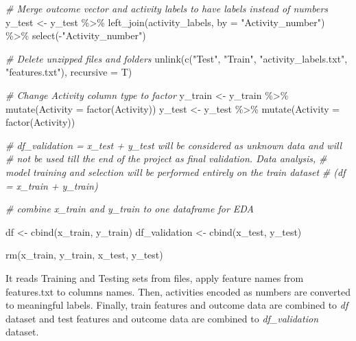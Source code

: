 \documentclass[
]{article}
\newenvironment{Shaded}{\begin{snugshade}}{\end{snugshade}}
\newcommand{\AttributeTok}[1]{\textcolor[rgb]{0.77,0.63,0.00}{#1}}
\newcommand{\CommentTok}[1]{\textcolor[rgb]{0.56,0.35,0.01}{\textit{#1}}}
\newcommand{\FunctionTok}[1]{\textcolor[rgb]{0.00,0.00,0.00}{#1}}
\newcommand{\NormalTok}[1]{#1}
\newcommand{\OtherTok}[1]{\textcolor[rgb]{0.56,0.35,0.01}{#1}}
\newcommand{\SpecialCharTok}[1]{\textcolor[rgb]{0.00,0.00,0.00}{#1}}
\newcommand{\StringTok}[1]{\textcolor[rgb]{0.31,0.60,0.02}{#1}}
\begin{document}
\begin{Shaded}
\begin{Highlighting}[]
\CommentTok{\# Merge outcome vector and activity labels to have labels instead of numbers}
\NormalTok{y\_test }\OtherTok{\textless{}{-}}\NormalTok{ y\_test }\SpecialCharTok{\%\textgreater{}\%}
    \FunctionTok{left\_join}\NormalTok{(activity\_labels, }\AttributeTok{by =} \StringTok{"Activity\_number"}\NormalTok{) }\SpecialCharTok{\%\textgreater{}\%}
    \FunctionTok{select}\NormalTok{(}\SpecialCharTok{{-}}\StringTok{"Activity\_number"}\NormalTok{)}

\CommentTok{\# Delete unzipped files and folders}
\FunctionTok{unlink}\NormalTok{(}\FunctionTok{c}\NormalTok{(}\StringTok{"Test"}\NormalTok{, }\StringTok{"Train"}\NormalTok{, }\StringTok{"activity\_labels.txt"}\NormalTok{, }\StringTok{"features.txt"}\NormalTok{), }\AttributeTok{recursive =}\NormalTok{ T)}

\CommentTok{\# Change Activity column type to factor}
\NormalTok{y\_train }\OtherTok{\textless{}{-}}\NormalTok{ y\_train }\SpecialCharTok{\%\textgreater{}\%}
    \FunctionTok{mutate}\NormalTok{(}\AttributeTok{Activity =} \FunctionTok{factor}\NormalTok{(Activity))}
\NormalTok{y\_test }\OtherTok{\textless{}{-}}\NormalTok{ y\_test }\SpecialCharTok{\%\textgreater{}\%}
    \FunctionTok{mutate}\NormalTok{(}\AttributeTok{Activity =} \FunctionTok{factor}\NormalTok{(Activity))}


\CommentTok{\# df\_validation = x\_test + y\_test will be considered as unknown data and will}
\CommentTok{\# not be used till the end of the project as final validation.  Data analysis,}
\CommentTok{\# model training and selection will be performed entirely on the train dataset}
\CommentTok{\# (df = x\_train + y\_train)}

\CommentTok{\# combine x\_train and y\_train to one dataframe for EDA}

\NormalTok{df }\OtherTok{\textless{}{-}} \FunctionTok{cbind}\NormalTok{(x\_train, y\_train)}
\NormalTok{df\_validation }\OtherTok{\textless{}{-}} \FunctionTok{cbind}\NormalTok{(x\_test, y\_test)}

\FunctionTok{rm}\NormalTok{(x\_train, y\_train, x\_test, y\_test)}
\end{Highlighting}
\end{Shaded}

It reads Training and Testing sets from files, apply feature names from
features.txt to columns names. Then, activities encoded as numbers are
converted to meaningful labels. Finally, train features and outcome data
are combined to \emph{df} dataset and test features and outcome data are
combined to \emph{df\_validation} dataset.
\end{document}
